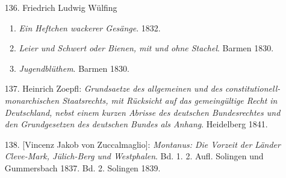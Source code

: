 \begin{enumerate}
\item[136.] Friedrich Ludwig Wülfing
\begin{enumerate}
    \item \textit{Ein Heftchen wackerer Gesänge}. 1832.
    \item \textit{Leier und Schwert oder Bienen, mit und ohne Stachel}. Barmen 1830.
    \item \textit{Jugendblüthem}. Barmen 1830.
\end{enumerate}

\item[137.] Heinrich Zoepfl: \textit{Grundsaetze des allgemeinen und des constitutionell-monarchischen Staatsrechts, mit Rücksicht auf das gemeingültige Recht in Deutschland, nebst einem kurzen Abrisse des deutschen Bundesrechtes und den Grundgesetzen des deutschen Bundes als Anhang}. Heidelberg 1841.

\item[138.] [Vincenz Jakob von Zuccalmaglio]: \textit{Montanus: Die Vorzeit der Länder Cleve-Mark, Jülich-Berg und Westphalen}. Bd. 1. 2. Aufl. Solingen und Gummersbach 1837. Bd. 2. Solingen 1839.

\end{enumerate}
